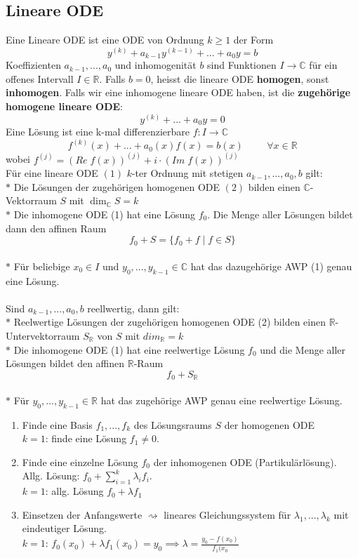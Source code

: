 \subsection{Lineare ODE}
  Eine Lineare ODE ist eine ODE von Ordnung $k\geq1$ der Form
  $$y^{(k)}+a_{k-1}y^{(k-1)}+...+a_0y=b$$ Koeffizienten $a_{k-1},...,a_0$ und
  inhomogenität $b$ sind Funktionen $I\rightarrow\mathbb C$ für ein offenes
  Intervall $I\in\mathbb R$.
  Falls $b=0$, heisst die lineare ODE \textbf{homogen}, sonst
  \textbf{inhomogen}. Falls wir eine inhomogene lineare ODE haben, ist die
  \textbf{zugehörige homogene lineare ODE}: $$y^{(k)}+...+a_0y=0$$
  Eine Lösung ist eine k-mal differenzierbare $f:I\rightarrow \mathbb C$
  $$f^{(k)}(x)+...+a_0(x)f(x)=b(x)\hspace{1cm}\forall x\in\mathbb R$$ wobei
  $f^{(j)}=(Re\; f(x))^{(j)} + i \cdot(Im\; f(x))^{(j)}$\\
  Für eine lineare ODE $(1)$ $k$-ter Ordnung mit stetigen $a_{k-1},...,a_0,b$ gilt:\\
  $*$ Die Lösungen der zugehörigen homogenen ODE $(2)$ bilden einen $\mathbb 
  C$-Vektorraum $S$ mit $\dim_{\mathbb C}S=k$\\
  $*$ Die inhomogene ODE (1) hat eine Lösung $f_0$. Die Menge aller Lösungen
  bildet dann den affinen Raum $$f_0+S=\{f_0+f\mid f\in S\}$$\\
  $*$ Für beliebige $x_0\in I$ und $y_0,...,y_{k-1}\in\mathbb C$ hat das
  dazugehörige AWP (1) genau eine Lösung.\\\\
  Sind $a_{k-1},...,a_0,b$ reellwertig, dann gilt:\\
  $*$ Reelwertige Lösungen der zugehörigen homogenen ODE (2) bilden einen
  $\mathbb R$-Untervektorraum $S_{\mathbb R}$ von $S$ mit $dim_{\mathbb R}=k$\\
  $*$ Die inhomogene ODE (1) hat eine reelwertige Lösung $f_0$ und die Menge
  aller Lösungen bildet den affinen $\mathbb R$-Raum $$f_0+S_{\mathbb R}$$\\
  $*$ Für $y_0,...,y_{k-1}\in\mathbb R$ hat das zugehörige AWP genau eine
  reelwertige Lösung.\\
  \begin{enumerate}
    \item Finde eine Basis \(f_1,...,f_k\) des Lösungsraums \(S\) der homogenen ODE\\
      \color{Maroon3} \(k=1\): finde eine Lösung \(f_1\neq0\).\color{defaultcolor}
    \item Finde eine einzelne Lösung $f_0$ der inhomogenen ODE (Partikulärlösung).
      Allg. Lösung: \(f_0+\sum\limits_{i=1}^{k}\lambda_i f_i\).\\
      \color{Maroon3} \(k=1\): allg. Lösung \(f_0+\lambda
      f_1\)\color{defaultcolor}
    \item Einsetzen der Anfangswerte \(\rightsquigarrow\) lineares
      Gleichungssystem für \(\lambda_1,...,\lambda_k\) mit eindeutiger Lösung.\\
      \color{Maroon3}\(k=1\): \(f_0(x_0)+\lambda f_1(x_0) = y_0 \implies \lambda
      = \frac{y_0 - f(x_0)}{f_1(x_0}\)
  \end{enumerate}
